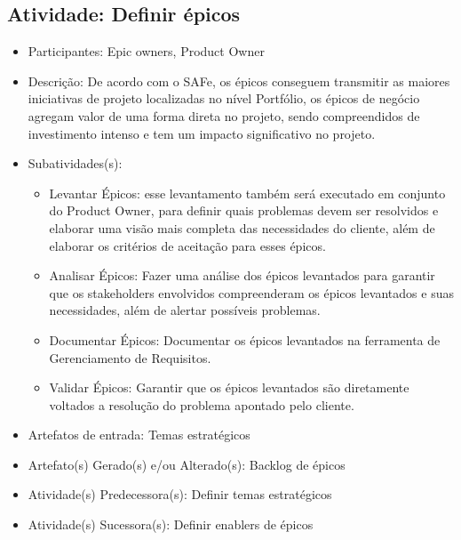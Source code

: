 \subsection{Atividade: Definir épicos}
\begin{itemize}
\item Participantes: Epic owners, Product Owner

\item Descrição: De acordo com o SAFe, os épicos conseguem transmitir as maiores iniciativas de projeto localizadas no nível Portfólio, os épicos de negócio agregam valor de uma forma direta no projeto, sendo compreendidos de investimento intenso e tem um impacto significativo no projeto. 

\item Subatividades(s): 
	\begin{itemize}
  	\item Levantar Épicos: esse levantamento também será executado em conjunto do Product Owner, para definir quais problemas devem ser resolvidos e elaborar uma visão mais completa das necessidades do cliente, além de elaborar os critérios de aceitação para esses épicos.
    \item Analisar Épicos: Fazer uma análise dos épicos levantados para garantir que os stakeholders envolvidos compreenderam os épicos levantados e suas necessidades, além de alertar possíveis problemas.
    \item Documentar Épicos:  Documentar os épicos levantados na ferramenta de Gerenciamento de Requisitos.
    \item Validar Épicos: Garantir que os épicos levantados são diretamente voltados a resolução do problema apontado pelo cliente.
    \end{itemize}
    
\item Artefatos de entrada: Temas estratégicos
 
\item Artefato(s) Gerado(s) e/ou Alterado(s): Backlog de épicos
\item Atividade(s) Predecessora(s): Definir temas estratégicos
\item Atividade(s) Sucessora(s): Definir enablers de épicos

\end{itemize}

